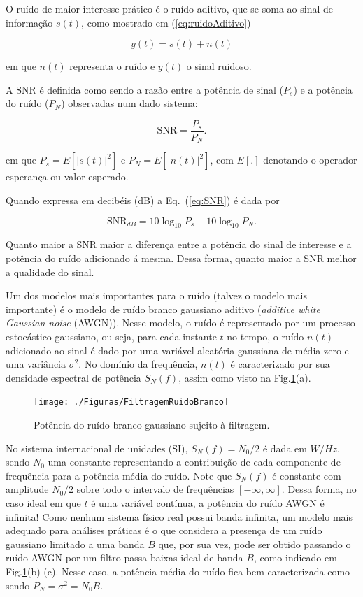 \documentclass[12pt,addpoints]{exam}
\begin{document}
O ruído de maior interesse prático é o ruído aditivo, que se soma ao sinal de informação $s(t)$, como mostrado em (\ref{eq:ruidoAditivo})

\begin{equation}\label{eq:ruidoAditivo}
y(t) = s(t) + n(t)
\end{equation}

\noindent em que $n(t)$ representa o ruído e $y(t)$ o sinal ruidoso.

A SNR é definida como sendo a razão entre a potência de sinal ($P_s$) e a potência do ruído ($P_N$) observadas num dado sistema:

\begin{equation}\label{eq:SNR}
 \mathrm{SNR} = \frac{P_s}{P_N}.
\end{equation}

\noindent em que $P_s = E[|s(t)|^2]$ e $P_N=E[|n(t)|^2]$, com $E[.]$ denotando o operador esperança ou valor esperado.

Quando expressa em decibéis (dB) a Eq.~(\ref{eq:SNR}) é dada por

\begin{equation}\label{eq:SNRdB}
 \mathrm{SNR}_{dB} = 10\log_{10}P_s-10\log_{10}P_N.
\end{equation}

Quanto maior a SNR maior a diferença entre a potência do sinal de interesse e a potência do ruído adicionado á mesma. Dessa forma, quanto maior a SNR melhor a qualidade do sinal.

Um dos modelos mais importantes para o ruído (talvez o modelo mais importante) é o modelo de ruído branco gaussiano aditivo (\textit{additive white Gaussian noise} (AWGN)). Nesse modelo, o ruído é representado por um processo estocástico gaussiano, ou seja, para cada instante $t$ no tempo, o ruído $n(t)$ adicionado ao sinal é dado por uma variável aleatória gaussiana de média zero e uma variância $\sigma^2$. No domínio da frequência, $n(t)$ é caracterizado por sua densidade espectral de potência $S_N(f)$, assim como visto na Fig.\ref{fig:ruidoFiltrado}(a). 

\begin{figure}[h!]
        \centering
        \texttt{[image: ./Figuras/FiltragemRuidoBranco]}
        \caption{Potência do ruído branco gaussiano sujeito à filtragem.} 
        \label{fig:ruidoFiltrado}
\end{figure}

No sistema internacional de unidades (SI), $S_N(f)=N_0/2$ é dada em $W/Hz$, sendo $N_0$ uma constante representando a contribuição de cada componente de frequência para a potência média do ruído. Note que $S_N(f)$ é constante com amplitude $N_0/2$ sobre todo o intervalo de frequências $[-\infty,\infty]$. Dessa forma, no caso ideal em que $t$ é uma variável contínua, a potência do ruído AWGN é infinita! Como nenhum sistema físico real possui banda infinita, um modelo mais adequado para análises práticas é o que considera a presença de um ruído gaussiano limitado a uma banda $B$ que,  por sua vez, pode ser obtido passando o ruído AWGN  por um filtro passa-baixas ideal de banda $B$, como indicado em Fig.\ref{fig:ruidoFiltrado}(b)-(c). Nesse caso, a potência média do ruído fica bem caracterizada como sendo $P_N = \sigma^2 = N_0B$.
\end{document}
